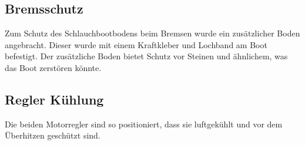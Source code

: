 \subsection{Bremsschutz}
Zum Schutz des Schlauchbootbodens beim Bremsen wurde ein zusätzlicher Boden angebracht. Dieser wurde mit einem Kraftkleber und Lochband am Boot befestigt. 
Der zusätzliche Boden bietet Schutz vor Steinen und ähnlichem, was das Boot zerstören könnte. 

\subsection{Regler Kühlung}
Die beiden Motorregler sind so positioniert, dass sie luftgekühlt und vor dem Überhitzen geschützt sind. 